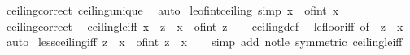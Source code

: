 \begin{isabellebody}
%
\isadelimproof
%
\endisadelimproof
%
\isatagproof
{}\isamarkupfalse%
\ ceiling{\isacharunderscore}{\kern0pt}correct\ ceiling{\isacharunderscore}{\kern0pt}unique\ \isamarkupfalse%
\ auto%
\endisatagproof
{\isafoldproof}%
%
\isadelimproof
\isanewline
%
\endisadelimproof
\isanewline
{}\isamarkupfalse%
\ le{\isacharunderscore}{\kern0pt}of{\isacharunderscore}{\kern0pt}int{\isacharunderscore}{\kern0pt}ceiling\ {\isacharbrackleft}{\kern0pt}simp{\isacharbrackright}{\kern0pt}{\isacharcolon}{\kern0pt}\ {\isachardoublequoteopen}x\ {\isasymle}\ of{\isacharunderscore}{\kern0pt}int\ {\isasymlceil}x{\isasymrceil}{\isachardoublequoteclose}\isanewline
%
\isadelimproof
\ \ %
\endisadelimproof
%
\isatagproof
{}\isamarkupfalse%
\ ceiling{\isacharunderscore}{\kern0pt}correct\ \isacommand{{\isachardot}{\kern0pt}{\isachardot}{\kern0pt}}\isamarkupfalse%
%
\endisatagproof
{\isafoldproof}%
%
\isadelimproof
\isanewline
%
\endisadelimproof
\isanewline
{}\isamarkupfalse%
\ ceiling{\isacharunderscore}{\kern0pt}le{\isacharunderscore}{\kern0pt}iff{\isacharcolon}{\kern0pt}\ {\isachardoublequoteopen}{\isasymlceil}x{\isasymrceil}\ {\isasymle}\ z\ {\isasymlongleftrightarrow}\ x\ {\isasymle}\ of{\isacharunderscore}{\kern0pt}int\ z{\isachardoublequoteclose}\isanewline
%
\isadelimproof
\ \ %
\endisadelimproof
%
\isatagproof
{}\isamarkupfalse%
\ ceiling{\isacharunderscore}{\kern0pt}def\ \isamarkupfalse%
\ le{\isacharunderscore}{\kern0pt}floor{\isacharunderscore}{\kern0pt}iff\ {\isacharbrackleft}{\kern0pt}of\ {\isachardoublequoteopen}{\isacharminus}{\kern0pt}\ z{\isachardoublequoteclose}\ {\isachardoublequoteopen}{\isacharminus}{\kern0pt}\ x{\isachardoublequoteclose}{\isacharbrackright}{\kern0pt}\ \isamarkupfalse%
\ auto%
\endisatagproof
{\isafoldproof}%
%
\isadelimproof
\isanewline
%
\endisadelimproof
\isanewline
{}\isamarkupfalse%
\ less{\isacharunderscore}{\kern0pt}ceiling{\isacharunderscore}{\kern0pt}iff{\isacharcolon}{\kern0pt}\ {\isachardoublequoteopen}z\ {\isacharless}{\kern0pt}\ {\isasymlceil}x{\isasymrceil}\ {\isasymlongleftrightarrow}\ of{\isacharunderscore}{\kern0pt}int\ z\ {\isacharless}{\kern0pt}\ x{\isachardoublequoteclose}\isanewline
%
\isadelimproof
\ \ %
\endisadelimproof
%
\isatagproof
{}\isamarkupfalse%
\ {\isacharparenleft}{\kern0pt}simp\ add{\isacharcolon}{\kern0pt}\ not{\isacharunderscore}{\kern0pt}le\ {\isacharbrackleft}{\kern0pt}symmetric{\isacharbrackright}{\kern0pt}\ ceiling{\isacharunderscore}{\kern0pt}le{\isacharunderscore}{\kern0pt}iff{\isacharparenright}{\kern0pt}%

\end{isabellebody}
